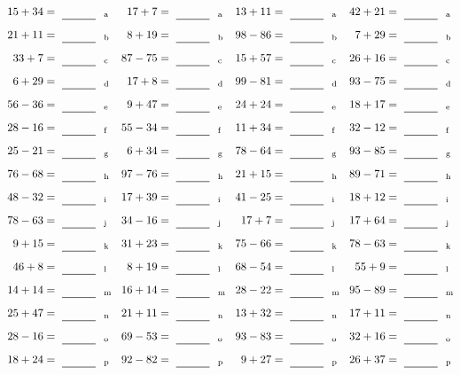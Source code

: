\documentclass
[
  draft    = true,
  fontsize = 11pt,
  parskip  = half-
]
{scrartcl}
\begin{document}
\clearpage
\begin{align*}
    \pline{15+34}&=\rline{a}
  & \pline{17+7}&=\rline{a}
  & \pline{13+11}&=\rline{a}
  & \pline{42+21}&=\rline{a} \\[1ex]
    \pline{21+11}&=\rline{b}
  & \pline{8+19}&=\rline{b}
  & \pline{98-86}&=\rline{b}
  & \pline{7+29}&=\rline{b} \\[1ex]
    \pline{33+7}&=\rline{c}
  & \pline{87-75}&=\rline{c}
  & \pline{15+57}&=\rline{c}
  & \pline{26+16}&=\rline{c} \\[1ex]
    \pline{6+29}&=\rline{d}
  & \pline{17+8}&=\rline{d}
  & \pline{99-81}&=\rline{d}
  & \pline{93-75}&=\rline{d} \\[1ex]
    \pline{56-36}&=\rline{e}
  & \pline{9+47}&=\rline{e}
  & \pline{24+24}&=\rline{e}
  & \pline{18+17}&=\rline{e} \\[1ex]
    \pline{28-16}&=\rline{f}
  & \pline{55-34}&=\rline{f}
  & \pline{11+34}&=\rline{f}
  & \pline{32-12}&=\rline{f} \\[1ex]
    \pline{25-21}&=\rline{g}
  & \pline{6+34}&=\rline{g}
  & \pline{78-64}&=\rline{g}
  & \pline{93-85}&=\rline{g} \\[1ex]
    \pline{76-68}&=\rline{h}
  & \pline{97-76}&=\rline{h}
  & \pline{21+15}&=\rline{h}
  & \pline{89-71}&=\rline{h} \\[1ex]
    \pline{48-32}&=\rline{i}
  & \pline{17+39}&=\rline{i}
  & \pline{41-25}&=\rline{i}
  & \pline{18+12}&=\rline{i} \\[1ex]
    \pline{78-63}&=\rline{j}
  & \pline{34-16}&=\rline{j}
  & \pline{17+7}&=\rline{j}
  & \pline{17+64}&=\rline{j} \\[1ex]
    \pline{9+15}&=\rline{k}
  & \pline{31+23}&=\rline{k}
  & \pline{75-66}&=\rline{k}
  & \pline{78-63}&=\rline{k} \\[1ex]
    \pline{46+8}&=\rline{l}
  & \pline{8+19}&=\rline{l}
  & \pline{68-54}&=\rline{l}
  & \pline{55+9}&=\rline{l} \\[1ex]
    \pline{14+14}&=\rline{m}
  & \pline{16+14}&=\rline{m}
  & \pline{28-22}&=\rline{m}
  & \pline{95-89}&=\rline{m} \\[1ex]
    \pline{25+47}&=\rline{n}
  & \pline{21+11}&=\rline{n}
  & \pline{13+32}&=\rline{n}
  & \pline{17+11}&=\rline{n} \\[1ex]
    \pline{28-16}&=\rline{o}
  & \pline{69-53}&=\rline{o}
  & \pline{93-83}&=\rline{o}
  & \pline{32+16}&=\rline{o} \\[1ex]
    \pline{18+24}&=\rline{p}
  & \pline{92-82}&=\rline{p}
  & \pline{9+27}&=\rline{p}
  & \pline{26+37}&=\rline{p}
\end{align*}
\end{document}
